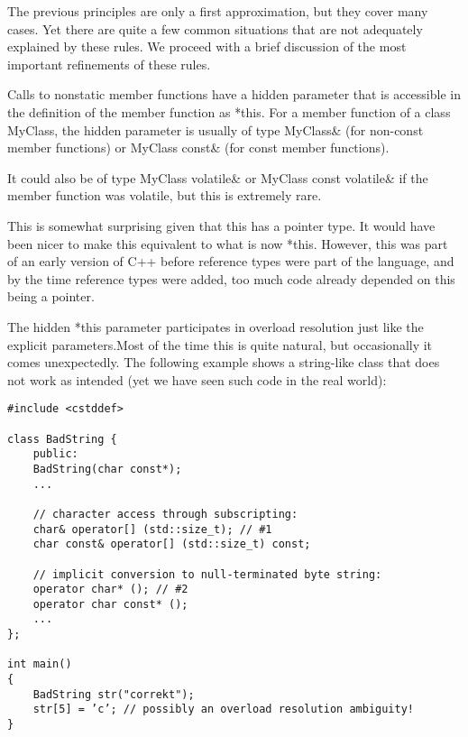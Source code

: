 The previous principles are only a first approximation, but they cover many cases. Yet there are quite a few common situations that are not adequately explained by these rules. We proceed with a brief discussion of the most important refinements of these rules.


Calls to nonstatic member functions have a hidden parameter that is accessible in the definition of the member function as *this. For a member function of a class MyClass, the hidden parameter is usually of type MyClass\& (for non-const member functions) or MyClass const\& (for const member functions).

\begin{tcolorbox}[colback=webgreen!5!white,colframe=webgreen!75!black]
\hspace*{0.75cm} It could also be of type MyClass volatile\& or MyClass const volatile\& if the member function was volatile, but this is extremely rare.
\end{tcolorbox}

This is somewhat surprising given that this has a pointer type. It would have been nicer to make this equivalent to what is now *this. However, this was part of an early version of C++ before reference types were part of the language, and by the time reference types were added, too much code already depended on this being a pointer.

The hidden *this parameter participates in overload resolution just like the explicit parameters.Most of the time this is quite natural, but occasionally it comes unexpectedly. The following example shows a string-like class that does not work as intended (yet we have seen such code in the real world):

\begin{lstlisting}[style=styleCXX]
#include <cstddef>

class BadString {
	public:
	BadString(char const*);
	...
	
	// character access through subscripting:
	char& operator[] (std::size_t); // #1
	char const& operator[] (std::size_t) const;
	
	// implicit conversion to null-terminated byte string:
	operator char* (); // #2
	operator char const* ();
	...
};

int main()
{
	BadString str("correkt");
	str[5] = ’c’; // possibly an overload resolution ambiguity!
}
\end{lstlisting}

